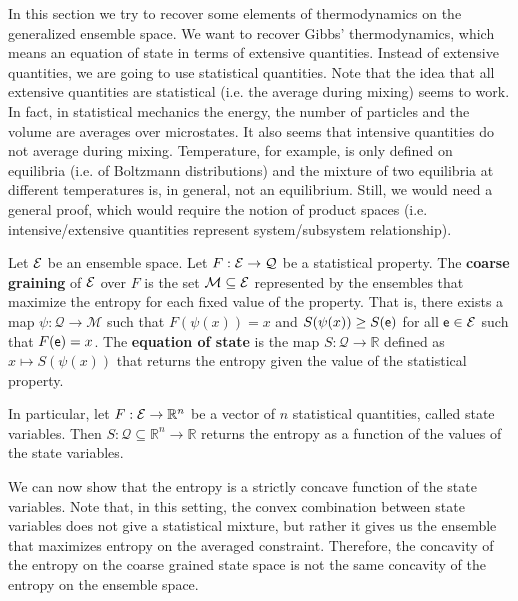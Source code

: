 In this section we try to recover some elements of thermodynamics on the generalized ensemble space. We want to recover Gibbs' thermodynamics, which means an equation of state in terms of extensive quantities. Instead of extensive quantities, we are going to use statistical quantities. Note that the idea that all extensive quantities are statistical (i.e. the average during mixing) seems to work. In fact, in statistical mechanics the energy, the number of particles and the volume are averages over microstates. It also seems that intensive quantities do not average during mixing. Temperature, for example, is only defined on equilibria (i.e. of Boltzmann distributions) and the mixture of two equilibria at different temperatures is, in general, not an equilibrium. Still, we would need a general proof, which would require the notion of product spaces (i.e. intensive/extensive quantities represent system/subsystem relationship).

\begin{mathSection}
\begin{defn}
	Let $\mathcal{E}$ be an ensemble space. Let $F : \mathcal{E} \to \mathcal{Q}$ be a statistical property. The \textbf{coarse graining} of $\mathcal{E}$ over $F$ is the set $\mathcal{M} \subseteq \mathcal{E}$ represented by the ensembles that maximize the entropy for each fixed value of the property. That is, there exists a map $\psi : \mathcal{Q} \to \mathcal{M}$ such that $F(\psi(x)) = x$ and $S(\psi(x)) \geq S(\mathsf{e})$ for all $\mathsf{e} \in \mathcal{E}$ such that $F(\mathsf{e}) = x$. The \textbf{equation of state} is the map $S : \mathcal{Q} \to \mathbb{R}$ defined as $x \mapsto S(\psi(x))$ that returns the entropy given the value of the statistical property.
	
	In particular, let $F : \mathcal{E} \to \mathbb{R}^n$ be a vector of $n$ statistical quantities, called state variables. Then $S : \mathcal{Q} \subseteq \mathbb{R}^n \to \mathbb{R}$ returns the entropy as a function of the values of the state variables.
\end{defn}
\end{mathSection}

We can now show that the entropy is a strictly concave function of the state variables. Note that, in this setting, the convex combination between state variables does not give a statistical mixture, but rather it gives us the ensemble that maximizes entropy on the averaged constraint. Therefore, the concavity of the entropy on the coarse grained state space is not the same concavity of the entropy on the ensemble space.

